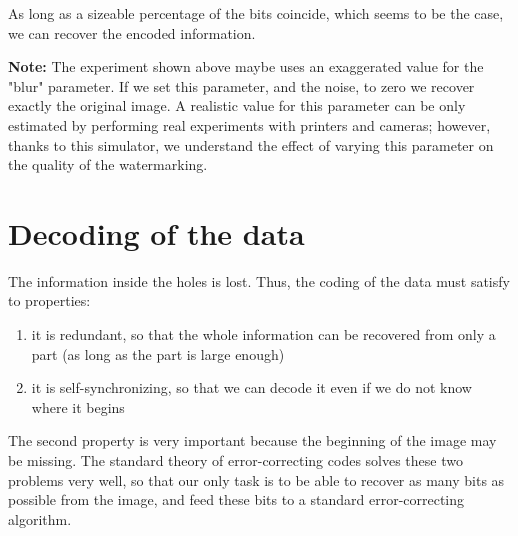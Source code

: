 As long as a sizeable percentage of the bits coincide, which seems to be the
case, we can recover the
encoded information.

{\bf Note:} The experiment shown above maybe uses an exaggerated value for
the "blur" parameter.  If we set this parameter, and the noise, to zero we
recover exactly the original image.  A realistic value for this parameter can
be only estimated by performing real experiments with printers and cameras;
however, thanks to this simulator, we understand the effect of varying this
parameter on the quality of the watermarking.


\section{Decoding of the data}

The information inside the holes is lost.  Thus, the coding of the data must
satisfy to properties:

\begin{enumerate}
	\item it is redundant, so that the whole information can be recovered
		from only a part (as long as the part is large enough)
	\item it is self-synchronizing, so that we can decode it even if we
		do not know where it begins
\end{enumerate}

The second property is very important because the beginning of the image may
be missing.  The standard theory of error-correcting codes solves these two
problems very well, so that our only task is to be able to recover as many
bits as possible from the image, and feed these bits to a standard
error-correcting algorithm.


